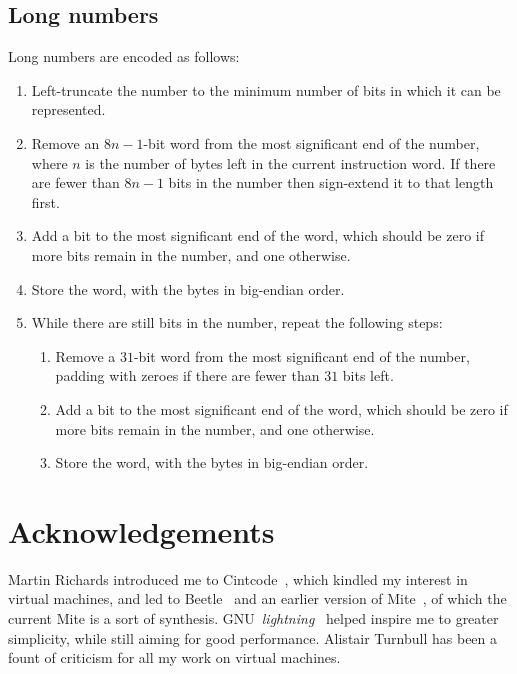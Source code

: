 \documentclass[english]{scrartcl}
\begin{document}
\subsection{Long numbers} \label{longnums}

Long numbers are encoded as follows:

\begin{enumerate}
\item Left-truncate the number to the minimum number of bits in which
  it can be represented.

\item Remove an $8n-1$-bit word from the most significant end of the
  number, where $n$ is the number of bytes left in the current
  instruction word. If there are fewer than $8n-1$ bits in the number
  then sign-extend it to that length first.

\item Add a bit to the most significant end of the word, which should
  be zero if more bits remain in the number, and one otherwise.

\item Store the word, with the bytes in big-endian order.

\item While there are still bits in the number, repeat the following
  steps:

  \begin{enumerate}
  \item Remove a $31$-bit word from the most significant end of the
    number, padding with zeroes if there are fewer than $31$ bits left.

  \item Add a bit to the most significant end of the word, which
    should be zero if more bits remain in the number, and one
    otherwise.

  \item Store the word, with the bytes in big-endian order.
  \end{enumerate}

\end{enumerate}



\section{Acknowledgements}

Martin Richards introduced me to Cintcode~\cite{cintweb}, which
kindled my interest in virtual machines, and led to
Beetle~\cite{beetledis} and an earlier version of Mite~\cite{mite0},
of which the current Mite is a sort of synthesis.
GNU~\emph{lightning}~\cite{lightning} helped inspire me to greater
simplicity, while still aiming for good performance. Alistair Turnbull
has been a fount of criticism for all my work on virtual machines.




\end{document}
